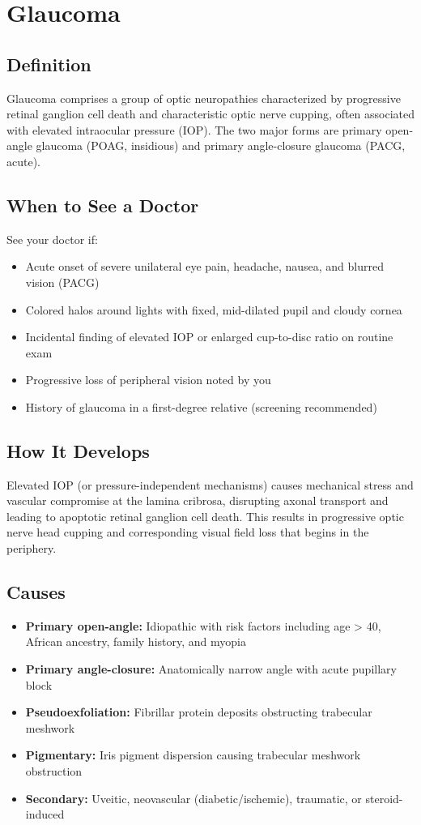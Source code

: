 \chapter{Glaucoma}

\section*{Definition}
Glaucoma comprises a group of optic neuropathies characterized by progressive retinal ganglion cell death and characteristic optic nerve cupping, often associated with elevated intraocular pressure (IOP). The two major forms are primary open-angle glaucoma (POAG, insidious) and primary angle-closure glaucoma (PACG, acute).

\section*{When to See a Doctor}
See your doctor if:
\begin{itemize}
  \item Acute onset of severe unilateral eye pain, headache, nausea, and blurred vision (PACG)
  \item Colored halos around lights with fixed, mid-dilated pupil and cloudy cornea
  \item Incidental finding of elevated IOP or enlarged cup-to-disc ratio on routine exam
  \item Progressive loss of peripheral vision noted by you
  \item History of glaucoma in a first-degree relative (screening recommended)
\end{itemize}

\section*{How It Develops}
Elevated IOP (or pressure-independent mechanisms) causes mechanical stress and vascular compromise at the lamina cribrosa, disrupting axonal transport and leading to apoptotic retinal ganglion cell death. This results in progressive optic nerve head cupping and corresponding visual field loss that begins in the periphery.

\section*{Causes}
\begin{itemize}
  \item \textbf{Primary open-angle:} Idiopathic with risk factors including age > 40, African ancestry, family history, and myopia
  \item \textbf{Primary angle-closure:} Anatomically narrow angle with acute pupillary block
  \item \textbf{Pseudoexfoliation:} Fibrillar protein deposits obstructing trabecular meshwork
  \item \textbf{Pigmentary:} Iris pigment dispersion causing trabecular meshwork obstruction
  \item \textbf{Secondary:} Uveitic, neovascular (diabetic/ischemic), traumatic, or steroid-induced
\end{itemize}

